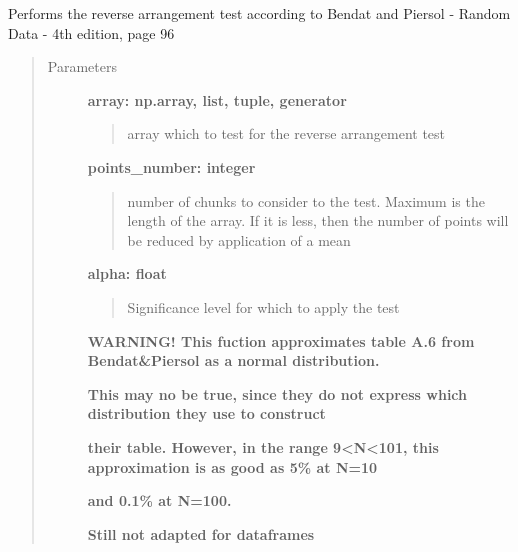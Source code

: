 \documentclass[a4paper,10pt,english]{sphinxmanual}
\begin{document}

\begin{fulllineitems}
\label{pymicra:pymicra.data.reverse_arrangement}
Performs the reverse arrangement test
according to Bendat and Piersol - Random Data - 4th edition, page 96
\begin{quote}\begin{description}
\item[{Parameters}] \leavevmode
\textbf{array: np.array, list, tuple, generator}
\begin{quote}

array which to test for the reverse arrangement test
\end{quote}

\textbf{points\_number: integer}
\begin{quote}

number of chunks to consider to the test. Maximum is the length of the array.
If it is less, then the number of points will be reduced by application of a mean
\end{quote}

\textbf{alpha: float}
\begin{quote}

Significance level for which to apply the test
\end{quote}

\textbf{WARNING! This fuction approximates table A.6 from Bendat\&Piersol as a normal distribution.}

\textbf{This may no be true, since they do not express which distribution they use to construct}

\textbf{their table. However, in the range 9\textless{}N\textless{}101, this approximation is as good as 5\% at N=10}

\textbf{and 0.1\% at N=100.}

\textbf{Still not adapted for dataframes}

\end{description}\end{quote}

\end{fulllineitems}

\end{document}
